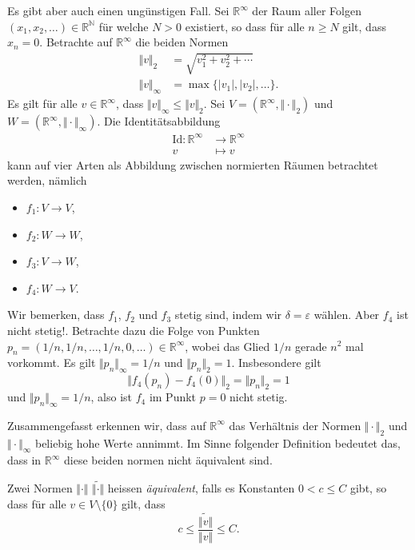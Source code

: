 \documentclass[../main.tex]{subfiles}
\begin{document}
Es gibt aber auch einen ungünstigen Fall.
Sei $\mathbb{R}^{\infty}$ der Raum aller Folgen
$(x_{1}, x_{2}, \dots) \in \mathbb{R}^{\mathbb{N}}$ 
für welche $N > 0$ existiert, so dass für alle $n \geq N$ 
gilt, dass $x_n = 0$.
Betrachte auf $\mathbb{R}^{\infty}$ die beiden Normen
\begin{align*}
  \Vert v \Vert_2 & = \sqrt{v_1^2 + v_2^2 + \cdots} \\
  \Vert v \Vert_{\infty} &= \max \{|v_1|, |v_2|, \dots\}.
\end{align*}
Es gilt für alle $v \in \mathbb{R}^{\infty}$,
dass $\Vert v \Vert_{\infty} \leq \Vert v \Vert_2$.
Sei $V = (\mathbb{R}^{\infty}, \Vert \cdot \Vert_2)$ 
und $W = (\mathbb{R}^{\infty}, \Vert \cdot \Vert_{\infty})$.
Die Identitätsabbildung
\begin{align*}
  \text{Id} \colon \mathbb{R}^{\infty} & \to \mathbb{R}^{\infty} \\
  v & \mapsto v
\end{align*}
kann auf vier Arten als Abbildung zwischen normierten Räumen
betrachtet werden, nämlich
\begin{itemize}
  \item $f_1 \colon V \to V$,
  \item $f_2 \colon W \to W$,
  \item $f_3 \colon V \to W$,
  \item $f_4 \colon W \to V$.
\end{itemize}
Wir bemerken, dass $f_1$, $f_2$ und $f_3$ stetig
sind, indem wir $\delta = \varepsilon$ wählen.
Aber $f_4$ ist nicht stetig!.
Betrachte dazu die Folge von Punkten
$p_n = (1/n, 1/n, \dots, 1/n, 0, \dots) \in \mathbb{R}^{\infty}$,
wobei das Glied $1/n$ gerade $n^2$ mal vorkommt.
Es gilt $\Vert p_n \Vert_{\infty} = 1/n$ 
und $\Vert p_n \Vert_{2} = 1$.
Insbesondere gilt
\[
  \Vert f_4(p_n) - f_4(0) \Vert_2 = \Vert p_n \Vert_2 = 1
\]
und $\Vert p_n \Vert_{\infty} = 1/n$,
also ist $f_4$ im Punkt $p = 0$ nicht stetig.

Zusammengefasst erkennen wir, dass auf $\mathbb{R}^{\infty}$ 
das Verhältnis der Normen $\Vert \cdot \Vert_2$ 
und $\Vert \cdot \Vert_{\infty}$ beliebig hohe Werte annimmt.
Im Sinne folgender Definition bedeutet das, dass in
$\mathbb{R}^{\infty}$ diese beiden normen nicht äquivalent sind.

\begin{definition}
  Zwei Normen $\Vert \cdot \Vert$ $\widetilde{\Vert \cdot \Vert}$
  heissen \emph{äquivalent},
  falls es Konstanten $0 < c \leq C$ gibt,
  so dass für alle $v \in V \setminus \{0\}$ gilt, dass
  \[
    c \leq \frac{\widetilde{\Vert v \Vert}}{\Vert v \Vert} \leq C.
  \]
\end{definition}
\end{document}
